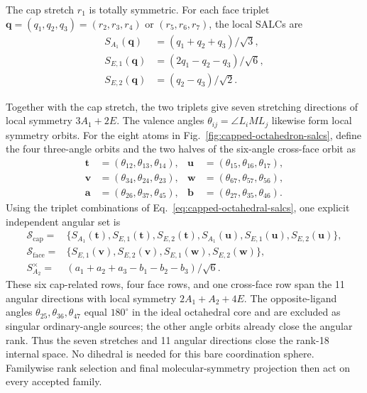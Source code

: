 \documentclass[journal=jctcce,manuscript=article,layout=traditional]{achemso}
\theoremstyle{definition}
\begin{document}
{The cap stretch \(r_1\) is totally symmetric. For each face triplet
\(\mathbf q=(q_1,q_2,q_3)=(r_2,r_3,r_4)\) or \((r_5,r_6,r_7)\), the local
SALCs are}
\begin{equation}
\begin{aligned}
 S_{A_1}(\mathbf q)&=(q_1+q_2+q_3)/\sqrt{3},\\
 S_{E,1}(\mathbf q)&=(2q_1-q_2-q_3)/\sqrt{6},\\
 S_{E,2}(\mathbf q)&=(q_2-q_3)/\sqrt{2}.
\end{aligned}
\label{eq:capped-octahedral-salcs}
\end{equation}
\begin{samepage}
{Together with the cap stretch, the two triplets give seven stretching
directions of local symmetry \(3A_1+2E\). The valence angles
\(\theta_{ij}=\angle L_iML_j\) likewise form local symmetry orbits. For the
eight atoms in Fig.~\ref{fig:capped-octahedron-salcs}, define the four
three-angle orbits and the two halves of the six-angle cross-face orbit as}
\begin{equation}
\begin{aligned}
\mathbf t&=(\theta_{12},\theta_{13},\theta_{14}), &
\mathbf u&=(\theta_{15},\theta_{16},\theta_{17}),\\
\mathbf v&=(\theta_{34},\theta_{24},\theta_{23}), &
\mathbf w&=(\theta_{67},\theta_{57},\theta_{56}),\\
\mathbf a&=(\theta_{26},\theta_{37},\theta_{45}), &
\mathbf b&=(\theta_{27},\theta_{35},\theta_{46}).
\end{aligned}
\label{eq:capped-octahedral-angle-orbits}
\end{equation}
{Using the triplet combinations of Eq.~\ref{eq:capped-octahedral-salcs},
one explicit independent angular set is}
\begin{equation}
\begin{aligned}
\mathcal S_{\mathrm{cap}}={}&\{S_{A_1}(\mathbf t),S_{E,1}(\mathbf t),S_{E,2}(\mathbf t),
S_{A_1}(\mathbf u),S_{E,1}(\mathbf u),S_{E,2}(\mathbf u)\},\\
\mathcal S_{\mathrm{face}}={}&\{S_{E,1}(\mathbf v),S_{E,2}(\mathbf v),
S_{E,1}(\mathbf w),S_{E,2}(\mathbf w)\},\\
S_{A_2}^{\times}={}&(a_1+a_2+a_3-b_1-b_2-b_3)/\sqrt{6}.
\end{aligned}
\label{eq:capped-octahedral-angular-salcs}
\end{equation}
{These six cap-related rows, four face rows, and one cross-face row span
the 11 angular directions with local symmetry \(2A_1+A_2+4E\). The
opposite-ligand angles \(\theta_{25},\theta_{36},\theta_{47}\) equal
\(180^\circ\) in the ideal octahedral core and are excluded as singular
ordinary-angle sources; the other angle orbits already close the angular
rank. Thus the seven stretches and 11 angular directions close the rank-18
internal space. No dihedral is needed for this bare coordination sphere.
Familywise rank selection and final molecular-symmetry projection then act
on every accepted family.}
\end{samepage}
\end{document}
